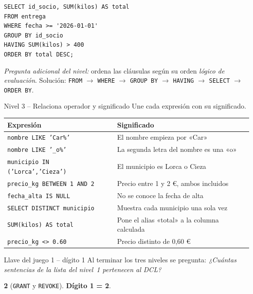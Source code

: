 \documentclass[11pt,a4paper]{article}
\begin{document}
\begin{solucion}
\begin{lstlisting}
SELECT id_socio, SUM(kilos) AS total
FROM entrega
WHERE fecha >= '2026-01-01'
GROUP BY id_socio
HAVING SUM(kilos) > 400
ORDER BY total DESC;
\end{lstlisting}

\smallskip
\emph{Pregunta adicional del nivel:} ordena las cláusulas según su orden \emph{lógico de
evaluación}. Solución: \texttt{FROM} $\rightarrow$ \texttt{WHERE} $\rightarrow$
\texttt{GROUP BY} $\rightarrow$ \texttt{HAVING} $\rightarrow$ \texttt{SELECT}
$\rightarrow$ \texttt{ORDER BY}.
\end{solucion}

\begin{reto}{Nivel 3 -- Relaciona operador y significado}
Une cada expresión con su significado.
\end{reto}

\begin{solucion}
\begin{tabularx}{\linewidth}{@{}lX@{}}
\toprule
\textbf{Expresión} & \textbf{Significado} \\
\midrule
\texttt{nombre LIKE 'Car\%'} & El nombre empieza por «Car» \\
\texttt{nombre LIKE '\_o\%'} & La segunda letra del nombre es una «o» \\
\texttt{municipio IN ('Lorca','Cieza')} & El municipio es Lorca o Cieza \\
\texttt{precio\_kg BETWEEN 1 AND 2} & Precio entre 1 y 2 €, ambos incluidos \\
\texttt{fecha\_alta IS NULL} & No se conoce la fecha de alta \\
\texttt{SELECT DISTINCT municipio} & Muestra cada municipio una sola vez \\
\texttt{SUM(kilos) AS total} & Pone el alias «total» a la columna calculada \\
\texttt{precio\_kg <> 0.60} & Precio distinto de 0,60 € \\
\bottomrule
\end{tabularx}
\end{solucion}

\begin{reto}{Llave del juego 1 -- dígito 1}
Al terminar los tres niveles se pregunta: \emph{¿Cuántas sentencias de la lista del
nivel~1 pertenecen al DCL?}
\end{reto}
\begin{solucion}
\textbf{2} (\texttt{GRANT} y \texttt{REVOKE}). \quad \textbf{Dígito 1 = 2}.
\end{solucion}
\end{document}
